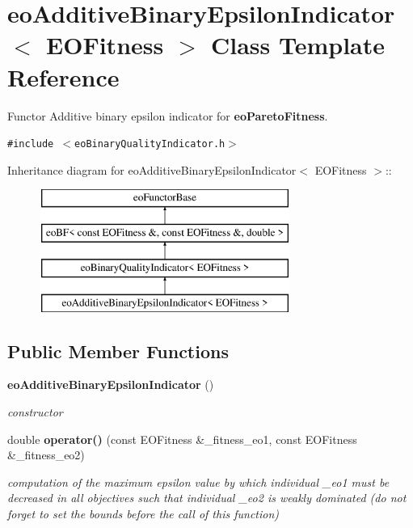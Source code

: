 \section{eo\-Additive\-Binary\-Epsilon\-Indicator$<$ EOFitness $>$ Class Template Reference}
\label{classeoAdditiveBinaryEpsilonIndicator}
Functor Additive binary epsilon indicator for {\bf eo\-Pareto\-Fitness}.  


{\tt \#include $<$eo\-Binary\-Quality\-Indicator.h$>$}

Inheritance diagram for eo\-Additive\-Binary\-Epsilon\-Indicator$<$ EOFitness $>$::\begin{figure}[H]
\begin{center}
\leavevmode
\includegraphics[height=4cm]{classeoAdditiveBinaryEpsilonIndicator}
\end{center}
\end{figure}
\subsection*{Public Member Functions}
\begin{CompactItemize}
\item 
{\bf eo\-Additive\-Binary\-Epsilon\-Indicator} ()\label{classeoAdditiveBinaryEpsilonIndicator_c76501f3d05bc3c1e9ccef6f9c465cb9}

\begin{CompactList}\small\item\em constructor \item\end{CompactList}\item 
double {\bf operator()} (const EOFitness \&\_\-fitness\_\-eo1, const EOFitness \&\_\-fitness\_\-eo2)
\begin{CompactList}\small\item\em computation of the maximum epsilon value by which individual \_\-eo1 must be decreased in all objectives such that individual \_\-eo2 is weakly dominated (do not forget to set the bounds before the call of this function) \item\end{CompactList}\end{CompactItemize}
